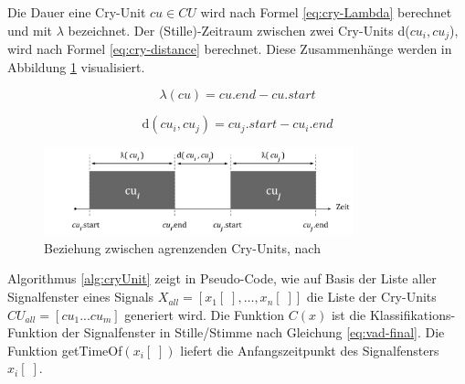 Die Dauer eine Cry-Unit $cu \in CU$ wird nach Formel \ref{eq:cry-Lambda} berechnet und mit $\lambda$ bezeichnet. Der (Stille)-Zeitraum zwischen zwei Cry-Units d($cu_i, cu_j$), wird nach Formel \ref{eq:cry-distance} berechnet. Diese Zusammenhänge werden in Abbildung \ref{img:cryUnit-details} visualisiert.\cite[S. 2]{vad_entropy}

\begin{equation}
\lambda (cu) = cu.end - cu.start
\label{eq:cry-Lambda}
\end{equation}

\begin{equation}
\text{d}(cu_i, cu_j) = cu_j.start - cu_i.end
\label{eq:cry-distance}
\end{equation}

\begin{figure}[h]
	\centering
	\includegraphics[width=0.8\textwidth]{bilder/newSmoothing05.png}
	\caption{Beziehung zwischen agrenzenden Cry-Units, nach \cite[S. 2]{vad_entropy}}
	\label{img:cryUnit-details}
\end{figure}

Algorithmus \ref{alg:cryUnit} zeigt in Pseudo-Code, wie auf Basis der Liste aller Signalfenster eines Signals $X_{all} = [x_1[\;] ,\ldots, x_n[\;]]$ die Liste der Cry-Units $CU_{all} = [cu_1 ... cu_m]$ generiert wird. Die Funktion $C(x)$ ist die Klassifikations-Funktion der Signalfenster in Stille/Stimme nach Gleichung \ref{eq:vad-final}. Die Funktion getTimeOf$(x_i[\;])$ liefert die Anfangszeitpunkt des Signalfensters $x_i[\;]$.

